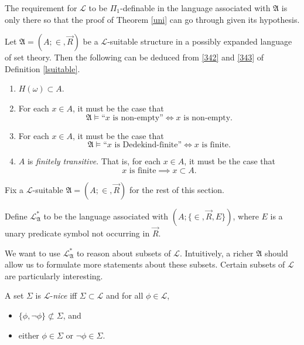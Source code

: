 \documentclass[12pt]{article}
\numberwithin{equation}{section}
\begin{document}
The requirement for $\mathcal{L}$ to be $\Pi_1$-definable in the language associated with $\mathfrak{A}$ is only there so that the proof of Theorem \ref{uni} can go through given its hypothesis.

\begin{rem}\label{rem35}
Let $\mathfrak{A} = (A; \in, \Vec{R})$ be a $\mathcal{L}$-suitable structure in a possibly expanded language of set theory. Then the following can be deduced from \ref{342} and \ref{343} of Definition \ref{lsuitable}.
\begin{enumerate}[label=(\arabic*)]
    \item\label{351} $H(\omega) \subset A$.
    \item\label{352} For each $x \in A$, it must be the case that
    \begin{equation*}
        \mathfrak{A} \models \text{``} x \text{ is non-empty''} \iff x \text{ is non-empty.}
    \end{equation*}
    \item\label{353} For each $x \in A$, it must be the case that
    \begin{equation*}
        \mathfrak{A} \models \text{``} x \text{ is Dedekind-finite''} \iff x \text{ is finite.}
    \end{equation*}
    \item\label{354} $A$ is \emph{finitely transitive}. That is, for each $x \in A$, it must be the case that
    \begin{equation*}
        x \text{ is finite} \implies x \subset A \text{.}
    \end{equation*}
\end{enumerate}
\end{rem}

Fix a $\mathcal{L}$-suitable $\mathfrak{A} = (A; \in, \Vec{R})$ for the rest of this section.

\begin{defi}
Define $\mathcal{L}^{*}_{\mathfrak{A}}$ to be the language associated with $(A; \{\in, \Vec{R}, E\})$, where $E$ is a unary predicate symbol not occurring in $\Vec{R}$. 
\end{defi}

We want to use $\mathcal{L}^{*}_{\mathfrak{A}}$ to reason about subsets of $\mathcal{L}$. Intuitively, a richer $\mathfrak{A}$ should allow us to formulate more statements about these subsets. Certain subsets of $\mathcal{L}$ are particularly interesting.

\begin{defi}\label{lnice}
A set $\Sigma$ is $\mathcal{L}$-\emph{nice} iff $\Sigma \subset \mathcal{L}$ and for all $\phi \in \mathcal{L}$, 
\begin{itemize}
    \item $\{\phi, \neg \phi\} \not\subset \Sigma$, and
    \item either $\phi \in \Sigma$ or $\neg \phi \in \Sigma$.
\end{itemize}
\end{defi}
\end{document}
